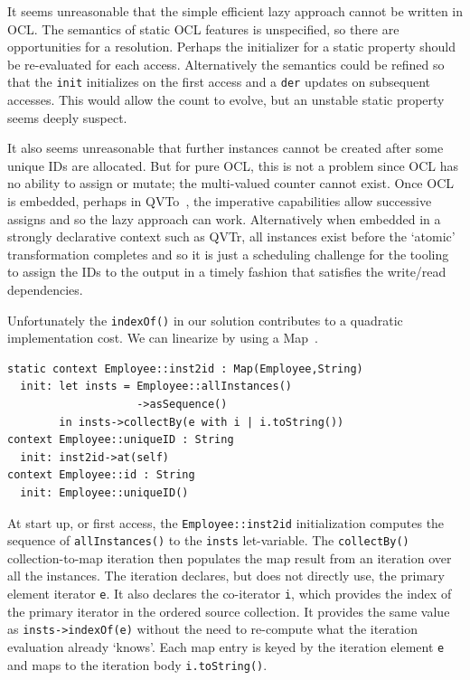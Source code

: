\documentclass[sigconf]{acmart}
\begin{document}
It seems unreasonable that the simple efficient lazy approach cannot be written in OCL. The semantics of static OCL features is unspecified, so there are opportunities for a resolution. Perhaps the initializer for a static property should be re-evaluated for each access. Alternatively the semantics could be refined so that the \verb|init| initializes on the first access and a \verb|der| updates on subsequent accesses. This would allow the count to evolve, but an unstable static property seems deeply suspect.

It also seems unreasonable that further instances cannot be created after some unique IDs are allocated. But for pure OCL, this is not a problem since OCL has no ability to assign or mutate; the multi-valued counter cannot exist. Once OCL is embedded, perhaps in QVTo~\cite{QVT-1.3}, the imperative capabilities allow successive assigns and so the lazy approach can work. Alternatively when embedded in a strongly declarative context such as QVTr, all instances exist before the `atomic' transformation completes and so it is just a scheduling challenge for the tooling to assign the IDs to the output in a timely fashion that satisfies the write/read dependencies.


Unfortunately the \verb|indexOf()| in our solution contributes to a quadratic implementation cost. We can linearize by using a Map~\cite{Willink-Map}.

\begin{verbatim}
static context Employee::inst2id : Map(Employee,String)
  init: let insts = Employee::allInstances()
                    ->asSequence()
        in insts->collectBy(e with i | i.toString())
context Employee::uniqueID : String
  init: inst2id->at(self)
context Employee::id : String
  init: Employee::uniqueID()
\end{verbatim} 

At start up, or first access, the \verb|Employee::inst2id| initialization computes the sequence of \verb|allInstances()| to the \verb|insts| let-variable. The  \verb|collectBy()| collection-to-map iteration then populates the map result from an iteration over all the instances. The iteration declares, but does not directly use, the primary element iterator \verb|e|. It also declares the co-iterator \verb|i|,  which provides the index of the primary iterator in the ordered source collection. It provides the same value as \verb|insts->indexOf(e)| without the need to re-compute what the iteration evaluation already `knows'. Each map entry is keyed by the iteration element \verb|e| and maps to the iteration body \verb|i.toString()|.
\end{document}
